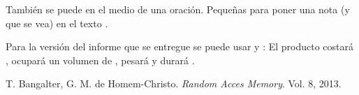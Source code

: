 



\lipsum[1-2]
																			

También se puede  en el medio de una oración. Pequeñas  para poner una nota (y que se vea) en el texto \cite{ref:cita1}.

Para la versión del informe que se entregue se puede usar \tbd y \tbc: El producto costará \TBD, ocupará un volumen de \tbd, pesará \TBC y durará \tbc.




\newpage
\begin{flushleft}
\begin{thebibliography}{9}
T. Bangalter, G. M. de Homem-Christo. \textit{Random Acces Memory}. Vol. 8, 2013.

\end{thebibliography}
\end{flushleft}



